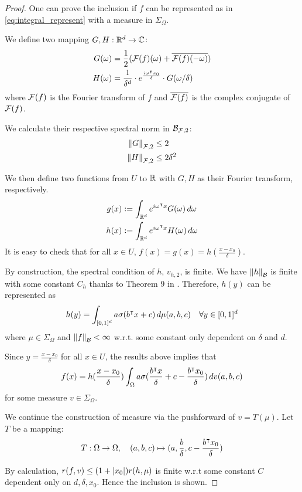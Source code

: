 \begin{proof}
One can prove the inclusion if $f$ can be represented as in
\eqref{eq:integral_represent} with a measure in $\Sigma_{\Omega}$.

We define two mapping $G, H: \mathbb{R}^d \to \mathbb{C}$:
\begin{align*}
    G(\omega) &= \frac{1}{2} (\mathcal{F}(f)(\omega) 
                    + \overline{\mathcal{F}(f)(-\omega)}) \\
    H(\omega) &= \frac{1}{\delta^d} \cdot 
                    e^{\frac{i \omega{}^{\intercal} x_0}{\delta}} \cdot 
                    G(\omega / \delta)
\end{align*}
where $\mathcal{F}(f)$ is the Fourier transform of $f$ and $\overline{\mathcal{F}(f)}$
is the complex conjugate of $\mathcal{F}(f)$.

We calculate their respective spectral norm in $\mathcal{B}_{\mathcal{F}, 2}$:
\begin{align}
    \left\| G \right\|_{\mathcal{F},2} &\leq 2 \\
    \left\| H \right\|_{\mathcal{F},2} &\leq 2\delta^2
\end{align}

We then define two functions from $U$ to $\mathbb{R}$ with $G,H$ as their Fourier
transform, respectively.
\begin{align*}
    g(x) &:= \int_{\mathbb{R}^d} e^{i\omega{}^{\intercal} x} G(\omega)\,d\omega\\
    h(x) &:= \int_{\mathbb{R}^d} e^{i\omega{}^{\intercal} x} H(\omega)\,d\omega\\
\end{align*}
It is easy to check that for all $x \in U$, $f(x)=g(x)=h(\frac{x-x_0}{\delta})$.

By construction, the spectral condition of $h$, $v_{h,2}$, is finite. We have
$\left\| h \right\|_{\mathcal{B}}$ is finite with some constant $C_h$ thanks to Theorem 9
in \cite{eMathematicalUnderstandingNeural2020}. Therefore, $h(y)$ can be
represented as
\begin{equation}
    h(y) = \int_{[0,1]^d} a \sigma(b{}^{\intercal} x + c) \,d\mu(a,b,c) \quad
    \forall y \in [0,1]^d
\end{equation}
where $\mu \in \Sigma_{\Omega}$ and $\left\| f \right\|_{\mathcal{B}} < \infty$ w.r.t. some
constant only dependent on $\delta$ and $d$.

Since $y=\frac{x-x_0}{\delta}$ for all $x\in U$, the results above implies that 
\begin{equation}
    f(x) = h(\frac{x-x_0}{\delta}) \int_{\Omega} a 
    \sigma(\frac{b{}^{\intercal} x}{\delta} + c - \frac{b{}^{\intercal} x_0}{\delta})\,dv(a,b,c)
\end{equation}
for some measure $v \in \Sigma_{\Omega}$.

We continue the construction of measure via the pushforward of $v = T(\mu)$. Let
$T$ be a mapping:
\begin{equation}
    T: \Omega \to \Omega, \quad
    (a,b,c) \mapsto (a, \frac{b}{\delta}, c - \frac{b{}^{\intercal} x_0}{\delta})
\end{equation}

By calculation, $r(f, v) \leq (1+\left| x_0 \right|) r(h, \mu)$ is finite w.r.t some
constant $C$ dependent only on $d,\delta,x_0$. Hence the inclusion is shown.

\end{proof}


